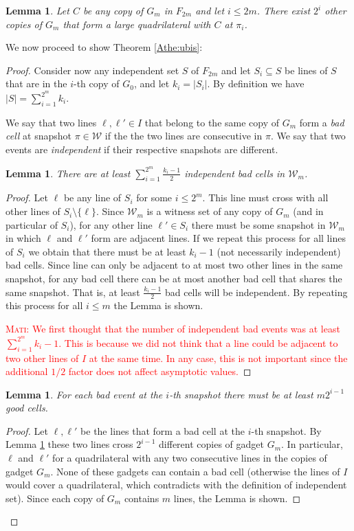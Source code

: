 \documentclass[11pt,a4paper]{article}
\newtheorem{lemma}[theorem]{Lemma}
\newcommand{\mati}[1]{\textcolor{red}{\textsc{Mati:} #1}}
\begin{document}
\begin{lemma}\label{Alem_charac}
Let $C$ be any copy of $G_m$ in $F_{2m}$ and let $i\leq 2m$. There exist $2^i$ other copies of $G_m$ that form a large quadrilateral with $C$ at $\pi_i$.
\end{lemma}

We now proceed to show Theorem \ref{Athe:ubis}:
\begin{proof}
Consider now any independent set $S$ of $F_{2m}$ and let $S_i\subseteq S$ be lines of $S$ that are in the $i$-th copy of $G_0$, and let $k_i=|S_i|$. By definition we have $|S|=\sum_{i=1}^{2^m}k_i$.

We say that two lines $\ell,\ell'\in I$ that belong to the same copy of $G_m$ form a {\em bad cell} at snapshot $\pi\in\mathcal{W}$ if the the two lines are consecutive in $\pi$. We say that two events are {\em independent} if their respective snapshots are different.

\begin{lemma}\label{Alem_minbad}
There are at least $\sum_{i=1}^{2^m}\frac{k_i-1}{2}$ independent bad cells in $\mathcal{W}_m$.
\end{lemma}
\begin{proof}
Let $\ell$ be any line of $S_i$ for some $i\leq 2^m$. This line must cross with all other lines of $S_i \setminus \{\ell\}$. Since  $\mathcal{W}_m$ is a witness set of any copy of $G_m$ (and in particular of  $S_i$), for any other line $\ell'\in S_i$ there must be some snapshot in $\mathcal{W}_m$ in which $\ell$ and $\ell'$ form are adjacent lines. If we repeat this process for all lines of $S_i$ we obtain that there must be at least $k_i-1$ (not necessarily independent) bad cells. Since line can only be adjacent to at most two other lines in the same snapshot, for any bad cell there can be at most another bad cell that shares the same snapshot. That is, at least $\frac{k_i-1}{2}$ bad cells will be independent. By repeating this process for all $i\leq m$ the Lemma is shown.

\mati{We first thought that the number of independent bad events was at least $\sum_{i=1}^{2^m}k_i-1$. This is because we did not think that a line could be adjacent to two other lines of $I$ at the same time. In any case, this is not important since the additional $1/2$ factor does not affect asymptotic values.}
\end{proof}

\begin{lemma}\label{Alem_maxbad}
For each bad event at the $i$-th snapshot there must be at least $m2^{i-1}$ good cells.
\end{lemma}
\begin{proof}
Let $\ell,\ell'$ be the lines that form a bad cell at the $i$-th snapshot. By Lemma \ref{Alem_charac} these two lines cross $2^{i-1}$ different copies of gadget $G_m$. In particular, $\ell$ and $\ell'$ for a quadrilateral with any two consecutive lines in the copies of gadget $G_m$. None of these gadgets can contain a bad cell (otherwise the lines of $I$ would cover a quadrilateral, which contradicts with the definition of independent set). Since each copy of $G_m$ contains $m$ lines, the Lemma is shown.
\end{proof}


\end{proof}
\end{document}
